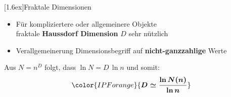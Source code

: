 \documentclass[final]{beamer}
\newlength{\columnheight}
\newlength{\marginw}
\newlength{\tw}
\newlength{\colw}
\newenvironment{myTwoColPoster}{%
  \begin{minipage}[t]{\textwidth}%
    \hspace*{\marginw}%
    \hspace*{9.5bp}%
    \begin{minipage}[t]{\tw}}%
  {\end{minipage}%
   \hspace*{\marginw}%
   \end{minipage}}
\newenvironment{myCol}%
    {\begin{minipage}[t][\columnheight][t]{\colw}}%
    {\end{minipage}}
\newenvironment{textblock}[1]%
    {\begin{block}{\rule[-0.6ex]{0pt}{2.4ex}\raisebox{-0.25ex}[1.6ex]{#1}}%
     \vspace*{5mm}}%
    {\vspace*{5mm}\end{block}}
\begin{document}
\begin{frame}[t]{}
\begin{myTwoColPoster}
\begin{myCol}
  \begin{textblock}{Fraktale Dimensionen}
    \Large
  \begin{itemize} \setlength\itemsep{1.1em} \Large
    \item F\"ur kompliziertere oder allgemeinere Objekte \\
    \hspace*{4cm}fraktale \textbf{Haussdorf Dimension} $D$ sehr n\"utzlich
    \item Verallgemeinerung Dimensionsbegriff auf \textcolor{IPForange}{\textbf{nicht-ganzzahlige}} Werte
  \end{itemize}
  \vspace*{1.5cm}
  Aus \textcolor{IPForange}{$N=n^D$} folgt, dass \textcolor{IPForange}{$\ln N=D\,\ln n$}  und somit:
  \begin{align*}
    \color{IPForange}{\boldsymbol{ D \simeq \frac{\ln N(n)} {\ln n}}}
  \end{align*}


\end{textblock}
\end{myCol}
\end{myTwoColPoster}
\end{frame}
\end{document}
